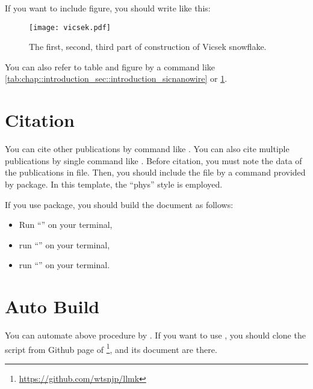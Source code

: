If you want to include figure, you should write like this:
\begin{figure}[htbp]
    \centering
    \texttt{[image: vicsek.pdf]}
    \caption{The first, second, third part of construction of Vicsek snowflake.}
    \label{fig:chap::introduction_sec::introduction_vicseksnowflake}
\end{figure}

You can also refer to table and figure by a  command
like \cref{tab:chap::introduction_sec::introduction_sicnanowire}
or \cref{fig:chap::introduction_sec::introduction_vicseksnowflake}.

\section{Citation} \label{sec:chap::introduction_citation}

You can cite other publications by  command like
\cite{10.1093/jmicro/dfaa015}.
You can also cite multiple publications by single  command
like \cite{10.1093/jmicro/dfaa015,Hayashi:2020:1533-4880:3038,Ishida_2019,doi:10.1063/1.4894003}.
Before citation, you must note the data of the publications
in  file.
Then, you should include the  file
by a  command provided by  package.
In this template, the ``phys'' style is employed.

If you use  package, you should build the document as follows:
\begin{itemize}
    \item Run ``'' on your terminal,
    \item run ``'' on your terminal,
    \item run ``'' on your terminal.
\end{itemize}



\section{Auto Build} \label{sec:chap::introduction_autobuild}

You can automate above procedure by .
If you want to use ,
you should clone the script from Github page of %
\footnote{\url{https://github.com/wtsnjp/llmk}},
and its document are there.
